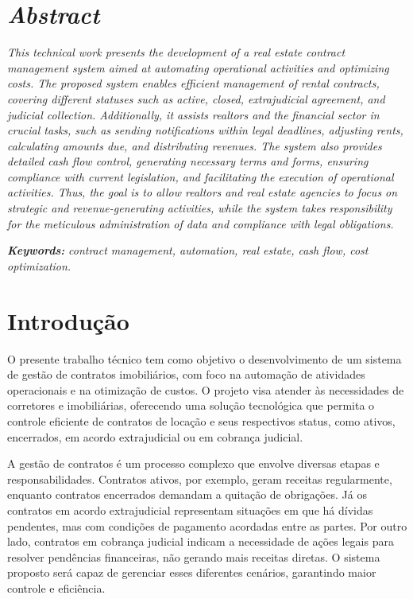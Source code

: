 \documentclass[a4paper,12pt]{article}
\begin{document}
    \vspace{1cm} %

    \section*{\textbf{\textit{Abstract}}} %
        \noindent %
        \textit{This technical work presents the development of a real estate contract management system aimed at automating operational activities and optimizing costs. The proposed system enables efficient management of rental contracts, covering different statuses such as active, closed, extrajudicial agreement, and judicial collection. Additionally, it assists realtors and the financial sector in crucial tasks, such as sending notifications within legal deadlines, adjusting rents, calculating amounts due, and distributing revenues. The system also provides detailed cash flow control, generating necessary terms and forms, ensuring compliance with current legislation, and facilitating the execution of operational activities. Thus, the goal is to allow realtors and real estate agencies to focus on strategic and revenue-generating activities, while the system takes responsibility for the meticulous administration of data and compliance with legal obligations.}

        \vspace{0.5cm} %
        \noindent \textit{\textbf{Keywords:}} \textit{contract management, automation, real estate, cash flow, cost optimization.}

    \section*{Introdução}

    O presente trabalho técnico tem como objetivo o desenvolvimento de um sistema de gestão de contratos imobiliários, com foco na automação de atividades operacionais e na otimização de custos. O projeto visa atender às necessidades de corretores e imobiliárias, oferecendo uma solução tecnológica que permita o controle eficiente de contratos de locação e seus respectivos status, como ativos, encerrados, em acordo extrajudicial ou em cobrança judicial.

    A gestão de contratos é um processo complexo que envolve diversas etapas e responsabilidades. Contratos ativos, por exemplo, geram receitas regularmente, enquanto contratos encerrados demandam a quitação de obrigações. Já os contratos em acordo extrajudicial representam situações em que há dívidas pendentes, mas com condições de pagamento acordadas entre as partes. Por outro lado, contratos em cobrança judicial indicam a necessidade de ações legais para resolver pendências financeiras, não gerando mais receitas diretas. O sistema proposto será capaz de gerenciar esses diferentes cenários, garantindo maior controle e eficiência.
\end{document}
